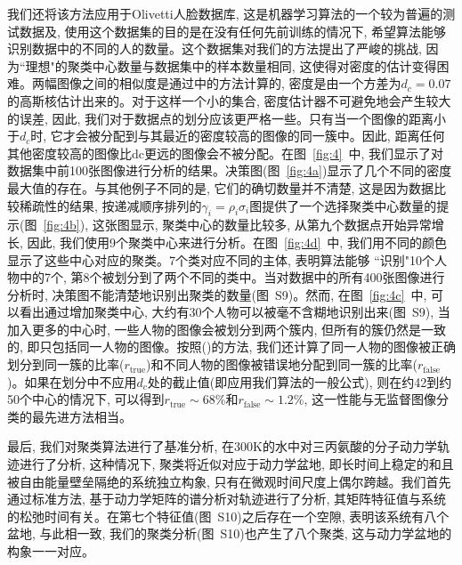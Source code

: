 我们还将该方法应用于Olivetti人脸数据库\cite{Samaria1994}, 这是机器学习算法的一个较为普遍的测试数据及, 使用这个数据集的目的是在没有任何先前训练的情况下, 希望算法能够识别数据中的不同的人的数量。这个数据集对我们的方法提出了严峻的挑战, 因为``理想"的聚类中心数量与数据集中的样本数量相同, 这使得对密度的估计变得困难。两幅图像之间的相似度是通过\cite{Sampat2009}中的方法计算的, 密度是由一个方差为$d_c=0.07$的高斯核\cite{Cheng1995}估计出来的。对于这样一个小的集合, 密度估计器不可避免地会产生较大的误差, 因此, 我们对于数据点的划分应该更严格一些。只有当一个图像的距离小于$d_c$时, 它才会被分配到与其最近的密度较高的图像的同一簇中。因此, 距离任何其他密度较高的图像比dc更远的图像会不被分配。在图~\ref{fig:4}~中, 我们显示了对数据集中前100张图像进行分析的结果。决策图(图~\ref{fig:4a})显示了几个不同的密度最大值的存在。与其他例子不同的是, 它们的确切数量并不清楚, 这是因为数据比较稀疏性的结果, 按递减顺序排列的$\gamma_i = \rho_i\sigma_i$图提供了一个选择聚类中心数量的提示(图~\ref{fig:4b}), 这张图显示, 聚类中心的数量比较多, 从第九个数据点开始异常增长, 因此, 我们使用9个聚类中心来进行分析。在图~\ref{fig:4d}~中, 我们用不同的颜色显示了这些中心对应的聚类。7个类对应不同的主体, 表明算法能够 ``识别"10个人物中的7个, 第8个被划分到了两个不同的类中。当对数据中的所有400张图像进行分析时, 决策图不能清楚地识别出聚类的数量(图~S9)。然而, 在图~\ref{fig:4c}~中, 可以看出通过增加聚类中心, 大约有30个人物可以被毫不含糊地识别出来(图~S9), 当加入更多的中心时, 一些人物的图像会被划分到两个簇内, 但所有的簇仍然是一致的, 即只包括同一人物的图像。按照\citeauthor{Dueck2007}(\citeyear{Dueck2007})的方法, 我们还计算了同一人物的图像被正确划分到同一簇的比率($r_{\mathrm{true}}$)和不同人物的图像被错误地分配到同一簇的比率($r_{\mathrm{false}}$)。如果在划分中不应用$d_c$处的截止值(即应用我们算法的一般公式), 则在约42到约50个中心的情况下, 可以得到$r_{\mathrm{true}}\sim 68\%$和$r_{\mathrm{false}}\sim 1.2\%$, 这一性能与无监督图像分类的最先进方法相当\cite{Dueck2007}。

最后, 我们对聚类算法进行了基准分析, 在300K的水\cite{Marinelli2009}中对三丙氨酸的分子动力学轨迹进行了分析, 这种情况下, 聚类将近似对应于动力学盆地, 即长时间上稳定的和且被自由能量壁垒隔绝的系统独立构象, 只有在微观时间尺度上偶尔跨越。我们首先通过标准方法\cite{Horenko2006}, 基于动力学矩阵的谱分析对轨迹进行了分析, 其矩阵特征值与系统的松弛时间有关。在第七个特征值(图~S10)之后存在一个空隙, 表明该系统有八个盆地, 与此相一致, 我们的聚类分析(图~S10)也产生了八个聚类, 这与动力学盆地的构象一一对应\cite{Horenko2006}。

